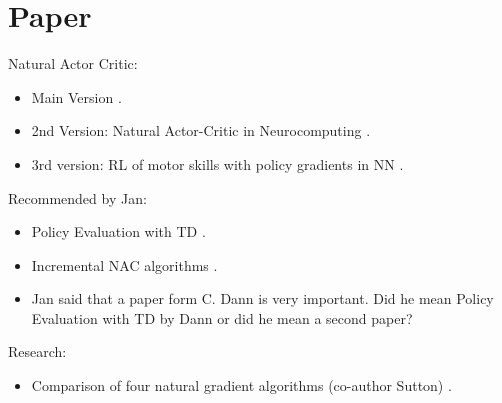 \author{First Author         \and
        Second Author %
}



\date{Received: date / Accepted: date}


\maketitle

\newpage

\section{Paper}
Natural Actor Critic:
\begin{itemize}
	\item Main Version \cite{peters2005natural}.
	\item 2nd Version: Natural Actor-Critic in Neurocomputing \cite{peters2008natural}.
	\item 3rd version: RL of motor skills with policy gradients in NN \cite{peters2008reinforcement}.
\end{itemize}

\noindent Recommended by Jan:
\begin{itemize}
	\item Policy Evaluation with TD \cite{dann2014policy}.
	\item Incremental NAC algorithms \cite{bhatnagar2008incremental}.
	\item Jan said that a paper form C. Dann is very important. Did he mean Policy Evaluation with TD by Dann or did he mean a second paper?
\end{itemize}

\noindent Research:
\begin{itemize}
	\item Comparison of four natural gradient algorithms (co-author Sutton) \cite{bhatnagar2009natural}.
\end{itemize}

